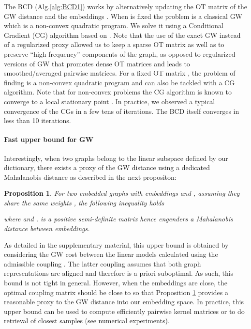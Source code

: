 \documentclass{article}
\newtheorem{proposition}{Proposition}
\begin{document}
	The BCD (Alg.\ref{alg:BCD1}) works by alternatively updating the OT matrix of the GW distance and the embeddings . When  is fixed the problem
	is a classical GW  {which is a non-convex quadratic program. We 
		solve it} using a Conditional Gradient (CG) algorithm
	\citep{jaggi2013revisiting} based on \citep{vayer-optimal-nodate}.  Note that the use of the exact GW instead of a regularized
	proxy allowed us to keep a sparse OT matrix as well as
	to  preserve ``high frequency'' components of the graph, as opposed to
	regularized versions of GW \citep{peyre2016gromov,solomon_entropic_2016,xu2019gromov} that promotes dense OT matrices
	and leads to smoothed/averaged pairwise matrices. For a fixed OT matrix , the problem of finding  is a non-convex
	quadratic program and can also be tackled with a CG algorithm.  Note that for non-convex
	problems the CG algorithm is
	known to converge to a local
	stationary point \citep{lacoste-julien-convergence-2016}. In practice, we
	observed a typical convergence of the CGs in a few tens of iterations. The BCD
	itself converges in less than 10 iterations.
	\paragraph{Fast upper bound for GW} Interestingly, when two graphs belong to
	the linear subspace defined by our dictionary, there exists a proxy of the GW distance using a
	dedicated Mahalanobis distance as described in the next propositon: 
	\begin{proposition}
		\label{prop:embed_graph}
		For two embedded graphs with embeddings  and , assuming they share the same weights , the following inequality holds
		
		where  and .  is a positive semi-definite matrix hence engenders a Mahalanobis distance between embeddings.
	\end{proposition}
	As detailed in the supplementary material, this upper bound is obtained by considering the GW cost between the linear models calculated using the admissible coupling . The latter coupling assumes that both graph representations are aligned and therefore is a priori suboptimal. As such, this bound is not tight in general. However, when the embeddings are close, the optimal coupling matrix should be close to  so that Proposition \ref{prop:embed_graph} provides a reasonable proxy to the GW distance into our embedding space. In practice, this upper bound can be used to compute efficiently pairwise kernel matrices or to do retrieval of closest samples (see numerical experiments).
	
\end{document}
